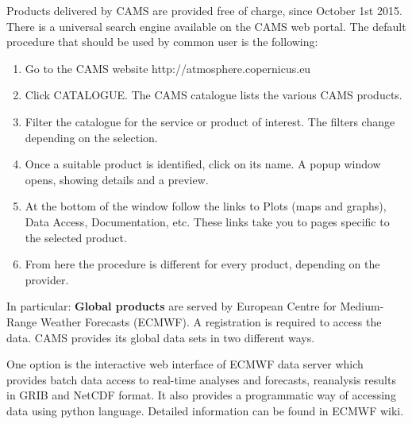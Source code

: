 \documentclass[9pt]{report}
\begin{document}
\noindent{}Products delivered by CAMS are provided free of charge, since October 1st 2015.
There is a universal search engine available on the CAMS web portal.
The default procedure that should be used by common user is the following:%

\begin{enumerate}[noitemsep,topsep=\mdcompacttopsep]%

\item{}Go to the CAMS website http://atmosphere.copernicus.eu%

\item{}Click CATALOGUE. The CAMS catalogue lists the various CAMS products.%

\item{}Filter the catalogue for the service or product of interest. The filters change depending on the selection.%

\item{}Once a suitable product is identified, click on its name. A popup window opens, showing details and a preview.%

\item{}At the bottom of the window follow the links to Plots (maps and graphs), Data Access, Documentation, etc. These links take you to pages specific to the selected product.%

\item{}From here the procedure is different for every product, depending on the provider.%
\end{enumerate}%

\noindent{}In particular:
\mdbr
{}\mdbr
{}\textbf{Global products} are served by European Centre for Medium-Range Weather Forecasts (ECMWF).
A registration is required to access the data.
CAMS provides its global data sets in two different ways.%

One option is the interactive web interface of ECMWF data server which provides batch data access to real-time analyses and forecasts, reanalysis results in GRIB and NetCDF format.
It also provides a programmatic way of accessing data using python language. Detailed information can be found in ECMWF wiki.%
\end{document}
